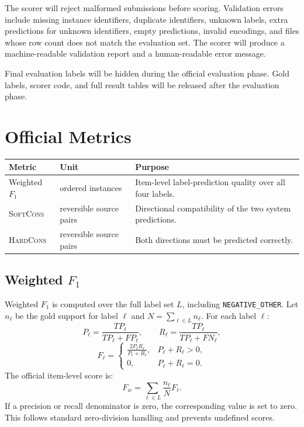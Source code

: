 \documentclass[10pt]{article}
\newcommand{\SoftCons}{\textsc{SoftCons}}
\newcommand{\HardCons}{\textsc{HardCons}}
\begin{document}
The scorer will reject malformed submissions before scoring.
Validation errors include missing instance identifiers, duplicate identifiers, unknown labels, extra predictions for unknown identifiers, empty predictions, invalid encodings, and files whose row count does not match the evaluation set.
The scorer will produce a machine-readable validation report and a human-readable error message.

Final evaluation labels will be hidden during the official evaluation phase.
Gold labels, scorer code, and full result tables will be released after the evaluation phase.

\section{Official Metrics}

\begin{center}
\small
\begin{tabular}{lll}
\toprule
Metric & Unit & Purpose \\
\midrule
Weighted $F_1$ & ordered instances & Item-level label-prediction quality over all four labels. \\
\SoftCons{} & reversible source pairs & Directional compatibility of the two system predictions. \\
\HardCons{} & reversible source pairs & Both directions must be predicted correctly. \\
\bottomrule
\end{tabular}
\end{center}

\subsection{Weighted \texorpdfstring{$F_1$}{F1}}

Weighted $F_1$ is computed over the full label set $L$, including \texttt{NEGATIVE\_OTHER}.
Let $n_\ell$ be the gold support for label $\ell$ and $N=\sum_{\ell\in L}n_\ell$.
For each label $\ell$:
\[
P_\ell=\frac{TP_\ell}{TP_\ell+FP_\ell}, \qquad
R_\ell=\frac{TP_\ell}{TP_\ell+FN_\ell},
\]
\[
F_\ell=
\begin{cases}
\frac{2P_\ell R_\ell}{P_\ell+R_\ell}, & P_\ell+R_\ell>0,\\
0, & P_\ell+R_\ell=0.
\end{cases}
\]
The official item-level score is:
\[
F_w=\sum_{\ell\in L}\frac{n_\ell}{N}F_\ell .
\]
If a precision or recall denominator is zero, the corresponding value is set to zero.
This follows standard zero-division handling and prevents undefined scores.
\end{document}
